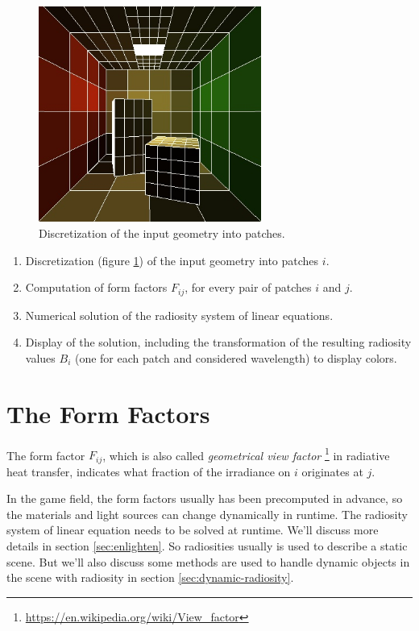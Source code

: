 \begin{figure}
\sidecaption
	\includegraphics[width=0.65\textwidth]{graphics/gi/path-24}
	\caption{Discretization of the input geometry into patches.}
	\label{f:Discretization}
\end{figure}

\begin{enumerate}
	\item  Discretization (figure \ref{f:Discretization}) of the input geometry into patches $i$.
	\item Computation of form factors $F_{ij}$, for every pair of patches $i$ and $j$.
	\item Numerical solution of the radiosity system of linear equations.
	\item Display of the solution, including the transformation of the resulting radiosity values $B_i$ (one for each patch and considered wavelength) to display colors.  
\end{enumerate}



\section{The Form Factors}
The form factor $F_{ij}$, which is also called \textit{geometrical view factor} \footnote{\url{https://en.wikipedia.org/wiki/View\_factor}} in radiative heat transfer, indicates what fraction of the irradiance on $i$ originates at $j$. 

In the game field, the form factors usually has been precomputed in advance, so the materials and light sources can change dynamically in runtime. The radiosity system of linear equation needs to be solved at runtime. We'll discuss more details in section \ref{sec:enlighten}. So radiosities usually is used to describe a static scene. But we'll also discuss some methods are used to handle dynamic objects in the scene with radiosity in section \ref{sec:dynamic-radiosity}. 

